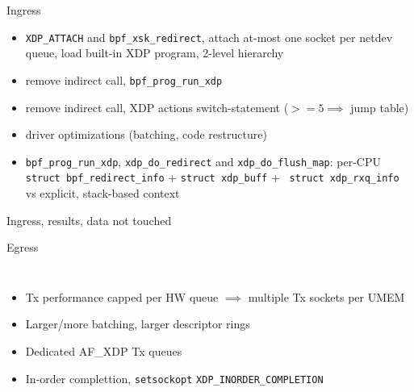 \documentclass[aspectratio=169]{beamer}
\begin{document}
  \begin{frame}{Ingress}
      \begin{itemize}
        \item {\tt XDP\_ATTACH} and {\tt bpf\_xsk\_redirect}, attach
          at-most one socket per netdev queue, load built-in XDP
          program, 2-level hierarchy
        \item remove indirect call, {\tt bpf\_prog\_run\_xdp}
        \item remove indirect call, XDP actions switch-statement ($>=5
          \implies$ jump table)
        \item driver optimizations (batching, code restructure)
        \item {\tt bpf\_prog\_run\_xdp}, {\tt xdp\_do\_redirect} and
          {\tt xdp\_do\_flush\_map}: per-CPU {\tt struct
            bpf\_redirect\_info} + {\tt struct xdp\_buff} + {\tt
            struct xdp\_rxq\_info} vs explicit, stack-based context
      \end{itemize}
  \end{frame}
  \begin{frame}{Ingress, results, data not touched}
  \end{frame}

  \begin{frame}{Egress}
  \begin{columns}[T,onlytextwidth]
    \begin{itemize}
    \item Tx performance capped per HW queue $\implies$ multiple Tx
      sockets per UMEM
    \item Larger/more batching, larger descriptor rings
    \item Dedicated AF\_XDP Tx queues
    \item In-order complettion, {\tt setsockopt} {\tt XDP\_INORDER\_COMPLETION}
    \end{itemize}
    \centering\resizebox{0.8\textwidth}{!}{}
    \end{columns}
  \end{frame}
\end{document}
